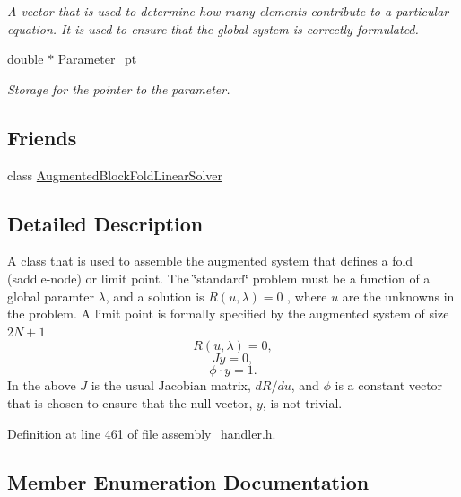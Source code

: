 \begin{DoxyCompactItemize}
\begin{DoxyCompactList}\small\item\em A vector that is used to determine how many elements contribute to a particular equation. It is used to ensure that the global system is correctly formulated. \end{DoxyCompactList}\item 
double $\ast$ \hyperlink{classoomph_1_1FoldHandler_ae32fb6242e77a273f82de2c491d36314}{Parameter\+\_\+pt}
\begin{DoxyCompactList}\small\item\em Storage for the pointer to the parameter. \end{DoxyCompactList}\end{DoxyCompactItemize}
\subsection*{Friends}
\begin{DoxyCompactItemize}
\item 
class \hyperlink{classoomph_1_1FoldHandler_a29d9c39e6a14d2a4cc4e0d7c716579fe}{Augmented\+Block\+Fold\+Linear\+Solver}
\end{DoxyCompactItemize}


\subsection{Detailed Description}
A class that is used to assemble the augmented system that defines a fold (saddle-\/node) or limit point. The \char`\"{}standard\char`\"{} problem must be a function of a global paramter $\lambda$, and a solution is $R(u,\lambda) = 0 $ , where $ u $ are the unknowns in the problem. A limit point is formally specified by the augmented system of size $ 2N+1 $ \[ R(u,\lambda) = 0, \] \[ Jy = 0, \] \[\phi\cdot y = 1. \] In the above $ J $ is the usual Jacobian matrix, $ dR/du $, and $ \phi $ is a constant vector that is chosen to ensure that the null vector, $ y $, is not trivial. 

Definition at line 461 of file assembly\+\_\+handler.\+h.



\subsection{Member Enumeration Documentation}
\mbox{\label{classoomph_1_1FoldHandler_a860a661fa02e4f000292fa19ea94df3e}} 
